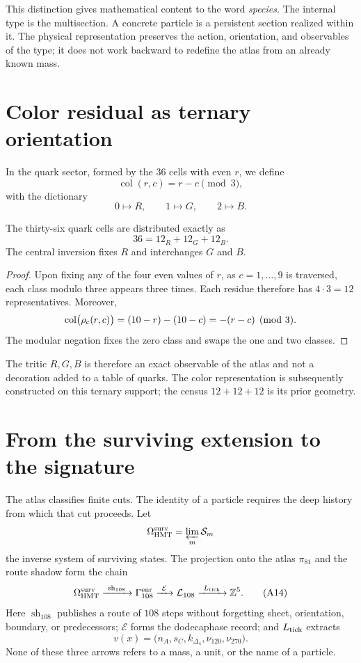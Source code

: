 This distinction gives mathematical content to the word \emph{species}. The internal type is the multisection. A concrete particle is a persistent section realized within it. The physical representation preserves the action, orientation, and observables of the type; it does not work backward to redefine the atlas from an already known mass.

\section{Color residual as ternary orientation}

In the quark sector, formed by the \(36\) cells with even \(r\), we define
\[
 \operatorname{col}(r,c)=r-c\pmod3,
 \tag{A12}\label{eq:color-residual-atlas-rev6}
\]
with the dictionary
\[
 0\longmapsto R,\qquad1\longmapsto G,\qquad2\longmapsto B.
\]

\begin{proposition}
\label{prop:color-atlas}
The thirty-six quark cells are distributed exactly as
\[
 36=12_R+12_G+12_B.
 \tag{A13}\label{eq:balance-color-atlas-rev6}
\]
The central inversion fixes \(R\) and interchanges \(G\) and \(B\).
\end{proposition}

\begin{proof}
Upon fixing any of the four even values of \(r\), as
\(c=1,\ldots,9\) is traversed, each class modulo three appears three times. Each residue
therefore has \(4\cdot3=12\) representatives. Moreover,
\[
 \operatorname{col}\bigl(\rho_{\rm c}(r,c)\bigr)
 =(10-r)-(10-c)
 =-(r-c)\pmod3.
\]
The modular negation fixes the zero class and swaps the one and two classes.
\end{proof}

The tritic \(R,G,B\) is therefore an exact observable of the atlas and not a
decoration added to a table of quarks.  The color representation is
subsequently constructed on this ternary support; the census \(12+12+12\) is its
prior geometry.

\section{From the surviving extension to the signature}

The atlas classifies finite cuts.  The identity of a particle requires the
deep history from which that cut proceeds.  Let
\[
 \Omega_{\rm HMT}^{\rm surv}
 =\varprojlim_m\mathcal S_m
\]
the inverse system of surviving states.  The projection onto the atlas \(\pi_{81}\) and the route
shadow form the chain
\[
 \Omega_{\rm HMT}^{\rm surv}
 \xrightarrow{\ \operatorname{sh}_{108}\ }
 \Gamma_{108}^{\rm enr}
 \xrightarrow{\ \mathcal E\ }
 \mathcal L_{108}
 \xrightarrow{\ L_{\rm tick}\ }
 \mathbb Z^5.
 \tag{A14}\label{eq:cadena-extension-firma-atlas-rev6}
\]
Here \(\operatorname{sh}_{108}\) publishes a route of \(108\) steps without
forgetting sheet, orientation, boundary, or predecessors; \(\mathcal E\) forms the
dodecaphase record; and \(L_{\rm tick}\) extracts
\[
 v(x)=
 \bigl(n_A,s_C,k_{\Delta_4},\nu_{120},\nu_{270}\bigr).
 \tag{A15}\label{eq:firma-cinco-extension-rev6}
\]
None of these three arrows refers to a mass, a unit, or the name of
a particle.

